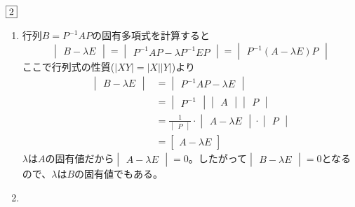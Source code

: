 \documentclass[dvipdfmx]{jsreport}
\begin{document}
\begin{souanswer} %
	$\fbox{2}$
\begin{enumerate}
	\item 行列$B= P^{-1}AP$の固有多項式を計算すると
\begin{equation*}
	\begin{vmatrix}B- \lambda E\end{vmatrix}= \begin{vmatrix}P^{-1}AP- \lambda P^{-1}EP\end{vmatrix}= \begin{vmatrix}P^{-1}(A- \lambda E)P\end{vmatrix}
\end{equation*}
	ここで行列式の性質($|XY|= |X||Y|$)より
\begin{align*}
	\begin{vmatrix}B- \lambda E\end{vmatrix}
	&= \begin{vmatrix}P^{-1}AP- \lambda E\end{vmatrix}\\
	&= \begin{vmatrix}P^{-1}\end{vmatrix}\begin{vmatrix}A\end{vmatrix}\begin{vmatrix}P\end{vmatrix}\\
	&= \frac{1}{\begin{vmatrix}P\end{vmatrix}}\cdot\begin{vmatrix}A- \lambda E\end{vmatrix}\cdot \begin{vmatrix}P\end{vmatrix}\\
	&= \begin{bmatrix}A- \lambda E\end{bmatrix}
\end{align*}
	$\lambda$は$A$の固有値だから$\begin{vmatrix}A- \lambda E\end{vmatrix}= 0$。したがって$\begin{vmatrix}B- \lambda E\end{vmatrix}= 0$となるので、$\lambda$は$B$の固有値でもある。
	\item 
{}
\end{enumerate}
\end{souanswer}
\end{document}

